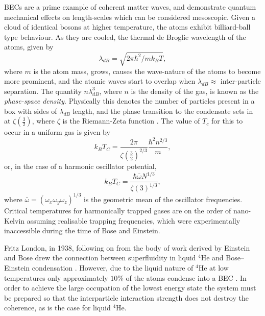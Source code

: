 BECs are a prime example of coherent matter waves, and demonstrate quantum mechanical effects on length-scales which can be considered mesoscopic. Given a cloud of identical bosons at higher temperature, the atoms exhibit billiard-ball type behaviour. As they are cooled, the thermal de Broglie wavelength of the atoms, given by
\begin{equation}
\lambda_{dB} = \sqrt{2\pi\hbar^2/mk_{B}T},
\end{equation}
where $m$ is the atom mass, grows, causes the wave-nature of the atoms to become more prominent, and the atomic waves start to overlap when $\lambda_{dB} \approx$ inter-particle separation. The quantity $n\lambda_{dB}^3$, where $n$ is the density of the gas, is known as the \emph{phase-space density}. Physically this denotes the number of particles present in a box with sides of $\lambda_{dB}$ length, and the phase transition to the condensate sets in at $\zeta\left(\frac{3}{2}\right)$, where $\zeta$ is the Riemann-Zeta function \cite{BK:Ueda_2010}. The value of $T_c$ for this to occur in a uniform gas is given by
\begin{equation}
k_BT_C = \frac{2\pi}{\zeta\left(\frac{3}{2}\right)^{2/3}}\frac{\hbar^2n^{2/3}}{m},
\end{equation}
or, in the case of a harmonic oscillator potential,
\begin{equation}
k_BT_C = \frac{\hbar\bar{\omega}N^{1/3}}{\zeta(3)^{1/3}},
\end{equation}
where $\bar{\omega}=(\omega_x\omega_y\omega_z)^{1/3}$ is the geometric mean of the oscillator frequencies. Critical temperatures for harmonically trapped gases are on the order of nano-Kelvin assuming realisable trapping frequencies, which were experimentally inaccessible during the time of Bose and Einstein.

Fritz London, in 1938, following on from the body of work derived by Einstein and Bose drew the connection between superfluidity in liquid $^4$He and Bose--Einstein condensation \cite[Chap.~1]{BK:Pitaevskii_Stringari_2003}. However, due to the liquid nature of $^4$He at low temperatures only approximately $10\%$ of the atoms condense into a BEC \cite{BEC:Penrose_pr_1956}. In order to achieve the large occupation of the lowest energy state the system must be prepared so that the interparticle interaction strength does not destroy the coherence, as is the case for liquid $^4$He.

